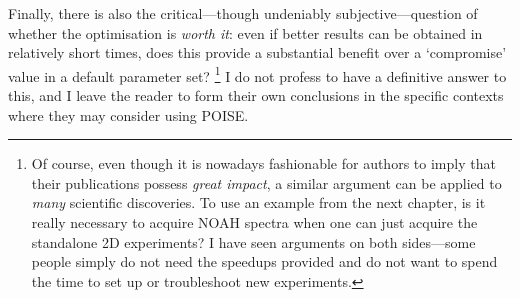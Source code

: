 Finally, there is also the critical---though undeniably subjective---question of whether the optimisation is \textit{worth it}: even if better results can be obtained in relatively short times, does this provide a substantial benefit over a `compromise' value in a default parameter set?%
\footnote{Of course, even though it is nowadays fashionable for authors to imply that their publications possess \textit{great impact}, a similar argument can be applied to \textit{many} scientific discoveries. To use an example from the next chapter, is it really necessary to acquire NOAH spectra when one can just acquire the standalone 2D experiments? I have seen arguments on both sides---some people simply do not need the speedups provided and do not want to spend the time to set up or troubleshoot new experiments.}
I do not profess to have a definitive answer to this, and I leave the reader to form their own conclusions in the specific contexts where they may consider using POISE.

